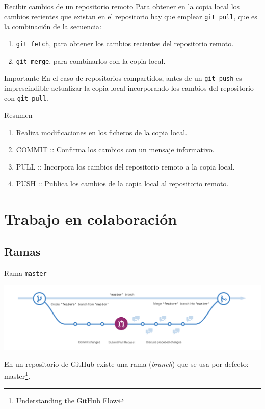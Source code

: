 \documentclass[xcolor={usenames,svgnames,dvipsnames}]{beamer}
\begin{document}
\begin{frame}[label={sec:org6faf51c},fragile]{Recibir cambios de un repositorio remoto}
 Para obtener en la copia local los cambios recientes que existan en el repositorio hay que emplear \texttt{git pull}, que es la combinación de la secuencia:
\begin{enumerate}
\item \texttt{git fetch}, para obtener los cambios recientes del repositorio remoto.
\item \texttt{git merge}, para combinarlos con la copia local.
\end{enumerate}

\begin{center}
\end{center}
\begin{block}{Importante}
En el caso de \alert{repositorios compartidos}, antes de un \texttt{git push} es imprescindible actualizar la copia local incorporando los cambios del repositorio con \texttt{git pull}.
\end{block}
\end{frame}
\begin{frame}[label={sec:org98d771d}]{Resumen}
\begin{enumerate}
\item Realiza modificaciones en los ficheros de la copia local.
\item \alert{COMMIT} :: Confirma los cambios con un mensaje informativo.
\item \alert{PULL} :: Incorpora los cambios del repositorio remoto a la copia local.
\item \alert{PUSH} :: Publica los cambios de la copia local al repositorio remoto.
\end{enumerate}
\end{frame}
\section{Trabajo en colaboración}
\label{sec:org168d1ab}
\subsection{Ramas}
\label{sec:orgd370f0e}

\begin{frame}[label={sec:org016b88b},fragile]{Rama \texttt{master}}
 \begin{center}
\includegraphics[width=.9\linewidth]{figs/branching.png}
\end{center}

En un repositorio de GitHub existe una rama (\emph{branch}) que se usa por defecto: \alert{master}\footnote{\href{https://guides.github.com/introduction/flow/}{Understanding the GitHub Flow}}.
\end{frame}
\end{document}
